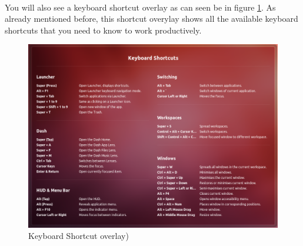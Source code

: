 \par \noindent {} \\

\par \noindent You will also see a keyboard shortcut overlay as can seen be in figure \ref{fig:shortcut-overlay}. As already mentioned before, this shortcut overylay shows all the available keyboard shortcuts that you need to know to work productively.  \\

\begin{figure}[ht!]	
	\centering
	\includegraphics[width=325pt]{./images/work-ubuntu/shortcut-overlay.png}
	\caption{Keyboard Shortcut overlay)}	
	\label{fig:shortcut-overlay}		
\end{figure}